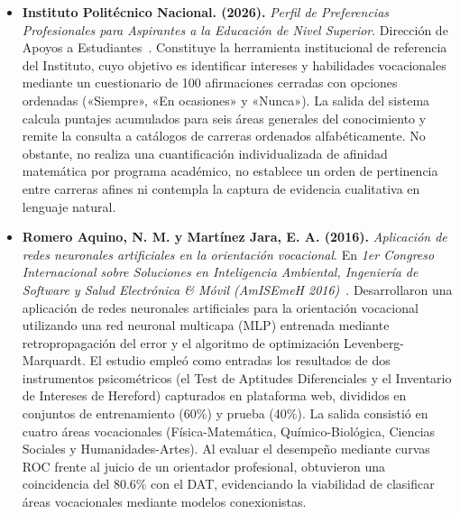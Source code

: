 \begin{itemize}
    \item \textbf{Instituto Politécnico Nacional. (2026).} \textit{Perfil de Preferencias Profesionales para Aspirantes a la Educación de Nivel Superior}. Dirección de Apoyos a Estudiantes~\cite{IPN2026Preferencias}. Constituye la herramienta institucional de referencia del Instituto, cuyo objetivo es identificar intereses y habilidades vocacionales mediante un cuestionario de 100 afirmaciones cerradas con opciones ordenadas («Siempre», «En ocasiones» y «Nunca»). La salida del sistema calcula puntajes acumulados para seis áreas generales del conocimiento y remite la consulta a catálogos de carreras ordenados alfabéticamente. No obstante, no realiza una cuantificación individualizada de afinidad matemática por programa académico, no establece un orden de pertinencia entre carreras afines ni contempla la captura de evidencia cualitativa en lenguaje natural.

    \item \textbf{Romero Aquino, N. M. y Martínez Jara, E. A. (2016).} \textit{Aplicación de redes neuronales artificiales en la orientación vocacional}. En \textit{1er Congreso Internacional sobre Soluciones en Inteligencia Ambiental, Ingeniería de Software y Salud Electrónica \& Móvil (AmISEmeH 2016)}~\cite{RomeroAquino2016}. Desarrollaron una aplicación de redes neuronales artificiales para la orientación vocacional utilizando una red neuronal multicapa (MLP) entrenada mediante retropropagación del error y el algoritmo de optimización Levenberg-Marquardt. El estudio empleó como entradas los resultados de dos instrumentos psicométricos (el Test de Aptitudes Diferenciales y el Inventario de Intereses de Hereford) capturados en plataforma web, divididos en conjuntos de entrenamiento (60\%) y prueba (40\%). La salida consistió en cuatro áreas vocacionales (Física-Matemática, Químico-Biológica, Ciencias Sociales y Humanidades-Artes). Al evaluar el desempeño mediante curvas ROC frente al juicio de un orientador profesional, obtuvieron una coincidencia del 80.6\% con el DAT, evidenciando la viabilidad de clasificar áreas vocacionales mediante modelos conexionistas.


\end{itemize}
